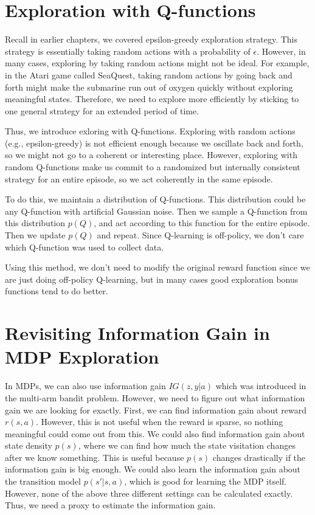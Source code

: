 \section{Exploration with Q-functions}
Recall in earlier chapters, we covered epsilon-greedy exploration strategy. This strategy is essentially taking random actions with a probability of $\epsilon$. However, in many cases, exploring by taking random actions might not be ideal. For example, in the Atari game called SeaQuest, taking random actions by going back and forth might make the submarine run out of oxygen quickly without exploring meaningful states. Therefore, we need to explore more efficiently by sticking to one general strategy for an extended period of time. 

Thus, we introduce exloring with Q-functions. Exploring with random actions (e.g., epsilon-greedy) is not efficient enough because we oscillate back and forth, so we might not go to a coherent or interesting place. However, exploring with random Q-functions make us commit to a randomized but internally consistent strategy for an entire episode, so we act coherently in the same episode. 

To do this, we maintain a distribution of Q-functions. This distribution could be any Q-function with artificial Gaussian noise. Then we sample a Q-function from this distribution $p(Q)$, and act according to this function for the entire episode. Then we update $p(Q)$ and repeat. Since Q-learning is off-policy, we don’t care which Q-function was used to collect data. 

Using this method, we don't need to modify the original reward function since we are just doing off-policy Q-learning, but in many cases good exploration bonus functions tend to do better.

\section{Revisiting Information Gain in MDP Exploration}
In MDPs, we can also use information gain $IG(z,y|a)$ which was introduced in the multi-arm bandit problem. However, we need to figure out what information gain we are looking for exactly. First, we can find information gain about reward $r(s,a)$. However, this is not useful when the reward is sparse, so nothing meaningful could come out from this. We could also find information gain about state density $p(s)$, where we can find how much the state visitation changes after we know something. This is useful because $p(s)$ changes drastically if the information gain is big enough. We could also learn the information gain about the transition model $p(s'|s,a)$, which is good for learning the MDP itself. However, none of the above three different settings can be calculated exactly. Thus, we need a proxy to estimate the information gain. 

